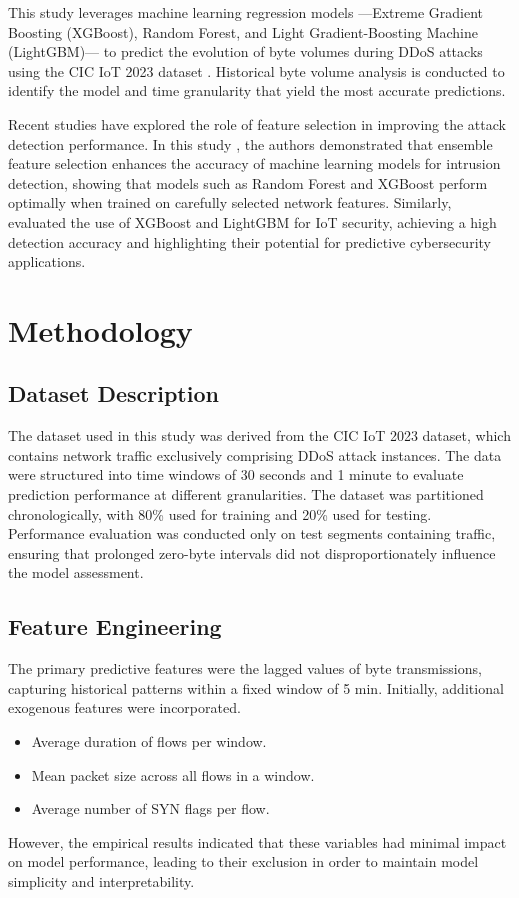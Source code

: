\documentclass[runningheads]{llncs}
\begin{document}
This study leverages machine learning regression models —Extreme Gradient Boosting (XGBoost), Random Forest, and Light Gradient-Boosting Machine (LightGBM)— to predict the evolution of byte volumes during DDoS attacks using the CIC IoT 2023 dataset \cite{ref_dataset1}. Historical byte volume analysis is conducted to identify the model and time granularity that yield the most accurate predictions.

Recent studies have explored the role of feature selection in improving the attack detection performance. In this study \cite{ref_article1}, the authors demonstrated that ensemble feature selection enhances the accuracy of machine learning models for intrusion detection, showing that models such as Random Forest and XGBoost perform optimally when trained on carefully selected network features. Similarly, \cite{ref_article2} evaluated the use of XGBoost and LightGBM for IoT security, achieving a high detection accuracy and highlighting their potential for predictive cybersecurity applications.

%
%
\section{Methodology}
\subsection{Dataset Description}
The dataset used in this study was derived from the CIC IoT 2023 dataset, which contains network traffic exclusively comprising DDoS attack instances. The data were structured into time windows of 30 seconds and 1 minute to evaluate prediction performance at different granularities. The dataset was partitioned chronologically, with 80\% used for training and 20\% used for testing. Performance evaluation was conducted only on test segments containing traffic, ensuring that prolonged zero-byte intervals did not disproportionately influence the model assessment.
%
\subsection{Feature Engineering}
The primary predictive features were the lagged values of byte transmissions, capturing historical patterns within a fixed window of 5 min.
Initially, additional exogenous features were incorporated.
\begin{itemize}
    \item Average duration of flows per window.
    \item Mean packet size across all flows in a window.
    \item Average number of SYN flags per flow.
\end{itemize}
However, the empirical results indicated that these variables had minimal impact on model performance, leading to their exclusion in order to maintain model simplicity and interpretability.
\end{document}
